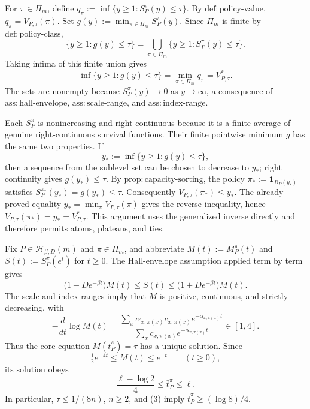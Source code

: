 For \(\pi\in\Pi_m\), define \(q_\pi:=\inf\{y\geq1:S_P^\pi(y)\leq\tau\}\).  By \(\mathrm{def{:}policy\text{-}value}\), \(q_\pi=V_{P,\tau}(\pi)\).  Set \(g(y):=\min_{\pi\in\Pi_m}S_P^\pi(y)\).  Since \(\Pi_m\) is finite by \(\mathrm{def{:}policy\text{-}class}\),
\[
\{y\geq1:g(y)\leq\tau\}
=\bigcup_{\pi\in\Pi_m}\{y\geq1:S_P^\pi(y)\leq\tau\}.
\]
Taking infima of this finite union gives
\[
\inf\{y\geq1:g(y)\leq\tau\}
=\min_{\pi\in\Pi_m}q_\pi
=V^*_{P,\tau}.
\]
The sets are nonempty because \(S_P^\pi(y)\to0\) as \(y\to\infty\), a consequence of \(\mathrm{ass{:}hall\text{-}envelope}\), \(\mathrm{ass{:}scale\text{-}range}\), and \(\mathrm{ass{:}index\text{-}range}\).

Each \(S_P^\pi\) is nonincreasing and right-continuous because it is a finite average of genuine right-continuous survival functions.  Their finite pointwise minimum \(g\) has the same two properties.  If
\[
y_*:=\inf\{y\geq1:g(y)\leq\tau\},
\]
then a sequence from the sublevel set can be chosen to decrease to \(y_*\); right continuity gives \(g(y_*)\leq\tau\).  By \(\mathrm{prop{:}capacity\text{-}sorting}\), the policy \(\pi_*:=\mathbf 1_{B_P(y_*)}\) satisfies \(S_P^{\pi_*}(y_*)=g(y_*)\leq\tau\).  Consequently \(V_{P,\tau}(\pi_*)\leq y_*\).  The already proved equality \(y_*=\min_\pi V_{P,\tau}(\pi)\) gives the reverse inequality, hence \(V_{P,\tau}(\pi_*)=y_*=V^*_{P,\tau}\).  This argument uses the generalized inverse directly and therefore permits atoms, plateaus, and ties.

Fix \(P\in\mathcal H_{\beta,D}(m)\) and \(\pi\in\Pi_m\), and abbreviate \(M(t):=M_P^\pi(t)\) and \(S(t):=S_P^\pi(e^t)\) for \(t\geq0\).  The Hall-envelope assumption applied term by term gives
\[
\bigl(1-De^{-\beta t}\bigr)M(t)\leq S(t)\leq
\bigl(1+De^{-\beta t}\bigr)M(t).                                      \tag{1}
\]
The scale and index ranges imply that \(M\) is positive, continuous, and strictly decreasing, with
\[
-\frac{d}{dt}\log M(t)
=\frac{\sum_x\alpha_{x,\pi(x)}c_{x,\pi(x)}e^{-\alpha_{x,\pi(x)}t}}
{\sum_xc_{x,\pi(x)}e^{-\alpha_{x,\pi(x)}t}}
\in[1,4].                                                               \tag{2}
\]
Thus the core equation \(M(\bar t_P^\pi)=\tau\) has a unique solution.  Since
\[
\tfrac12 e^{-4t}\leq M(t)\leq e^{-t}\qquad(t\geq0),
\]
its solution obeys
\[
\frac{\ell-\log2}{4}\leq\bar t_P^\pi\leq\ell.                         \tag{3}
\]
In particular, \(\tau\leq1/(8n)\), \(n\geq2\), and (3) imply \(\bar t_P^\pi\geq(\log8)/4\).

